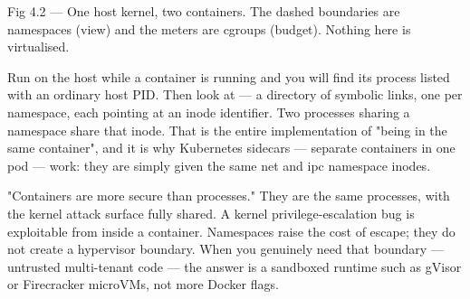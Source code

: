 \begin{wbfigure}{Fig 4.2 — One host kernel, two containers. The dashed boundaries are namespaces (view) and the meters are cgroups (budget). Nothing here is virtualised.}
\end{wbfigure}

\begin{behind}
Run  on the host while a container is running and you will find its process listed with an ordinary host PID. Then look at  --- a directory of symbolic links, one per namespace, each pointing at an inode identifier. Two processes sharing a namespace share that inode. That is the entire implementation of "being in the same container", and it is why Kubernetes sidecars --- separate containers in one pod --- work: they are simply given the same net and ipc namespace inodes.
\end{behind}

\begin{misconception}
"Containers are more secure than processes." They are the same processes, with the kernel attack surface fully shared. A kernel privilege-escalation bug is exploitable from inside a container. Namespaces raise the cost of escape; they do not create a hypervisor boundary. When you genuinely need that boundary --- untrusted multi-tenant code --- the answer is a sandboxed runtime such as gVisor or Firecracker microVMs, not more Docker flags.
\end{misconception}

